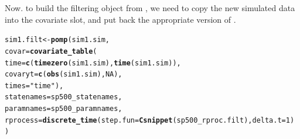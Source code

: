 \documentclass{beamer}\usepackage[]{graphicx}\usepackage[]{color}
\makeatletter
\newcommand{\hlnum}[1]{\textcolor[rgb]{0.686,0.059,0.569}{#1}}%
\newcommand{\hlstr}[1]{\textcolor[rgb]{0.192,0.494,0.8}{#1}}%
\newcommand{\hlstd}[1]{\textcolor[rgb]{0.345,0.345,0.345}{#1}}%
\newcommand{\hlkwb}[1]{\textcolor[rgb]{0.69,0.353,0.396}{#1}}%
\newcommand{\hlkwc}[1]{\textcolor[rgb]{0.333,0.667,0.333}{#1}}%
\newcommand{\hlkwd}[1]{\textcolor[rgb]{0.737,0.353,0.396}{\textbf{#1}}}%
\newenvironment{kframe}{%
 \def\at@end@of@kframe{}%
 \ifinner\ifhmode%
  \def\at@end@of@kframe{\end{minipage}}%
  \begin{minipage}{\columnwidth}%
 \fi\fi%
 \def\FrameCommand##1{\hskip\@totalleftmargin \hskip-\fboxsep
 \colorbox{shadecolor}{##1}\hskip-\fboxsep
     \hskip-\linewidth \hskip-\@totalleftmargin \hskip\columnwidth}%
 \MakeFramed {\advance\hsize-\width
   \@totalleftmargin\z@ \linewidth\hsize
   \@setminipage}}%
 {\par\unskip\endMakeFramed%
 \at@end@of@kframe}
\newenvironment{knitrout}{}{} %
\makeatother
\begin{document}
\begin{frame}[fragile]

\bi

\item Now. to build the filtering object from , we need to copy the new simulated data into the covariate slot, and put back the appropriate version of .


\ei

\begin{knitrout}\small
{}\color{fgcolor}\begin{kframe}
\begin{alltt}
\hlstd{sim1.filt} \hlkwb{<-} \hlkwd{pomp}\hlstd{(sim1.sim,}
  \hlkwc{covar}\hlstd{=}\hlkwd{covariate_table}\hlstd{(}
    \hlkwc{time}\hlstd{=}\hlkwd{c}\hlstd{(}\hlkwd{timezero}\hlstd{(sim1.sim),}\hlkwd{time}\hlstd{(sim1.sim)),}
    \hlkwc{covaryt}\hlstd{=}\hlkwd{c}\hlstd{(}\hlkwd{obs}\hlstd{(sim1.sim),}\hlnum{NA}\hlstd{),}
    \hlkwc{times}\hlstd{=}\hlstr{"time"}\hlstd{),}
  \hlkwc{statenames}\hlstd{=sp500_statenames,}
  \hlkwc{paramnames}\hlstd{=sp500_paramnames,}
  \hlkwc{rprocess}\hlstd{=}\hlkwd{discrete_time}\hlstd{(}\hlkwc{step.fun}\hlstd{=}\hlkwd{Csnippet}\hlstd{(sp500_rproc.filt),}\hlkwc{delta.t}\hlstd{=}\hlnum{1}\hlstd{)}
\hlstd{)}
\end{alltt}
\end{kframe}
\end{knitrout}

\end{frame}
\end{document}
